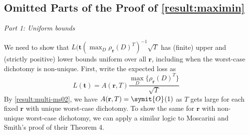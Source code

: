 \documentclass{fancyArticle}
\renewcommand{\|}{\,|\,}                    %
\providecommand{\;}{\,;}                    %
\renewcommand{\O}{\symit{O}\:\!}            %
\begin{document}
\begin{appendix}

  \subsection{Omitted Parts of the Proof of \autoref{result:maximin}}
  \label{sec:proof-maximin}

  \noindent\textit{Part 1: Uniform bounds}

  We need to show that $L(\mathbf{t}(\max_D \rho_{\mathbf{r}}(D)^{T})^{-1}\sqrt{T}$ has (finite) upper and (strictly positive) lower bounds uniform over all $\mathbf{r}$, including when the worst-case dichotomy is non-unique.
  First, write the expected loss as
  \begin{equation*}
    L(\mathbf{t}) = A(\mathbf{r},T)
    \frac{\textstyle\max_{D}\{\rho_{\mathbf{r}}{(D)}^{T}\}}{\sqrt{T}}
  \end{equation*}
  By \autoref{result:multi-ms02}, we have $A(\mathbf{r},T)=\O(1)$ as $T$ gets large for each fixed $\mathbf{r}$ with unique worst-case dichotomy.
  To show the same for $\mathbf{r}$ with non-unique worst-case dichotomy, we can apply a similar logic to Moscarini and Smith's proof of their Theorem 4.


\end{appendix}
\end{document}
